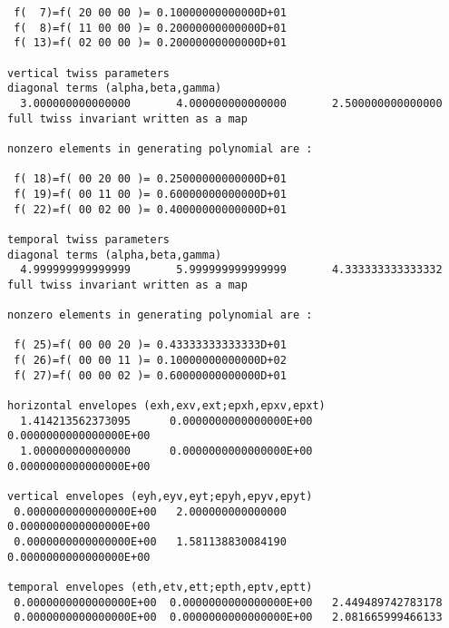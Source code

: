 \begin{footnotesize}
\begin{verbatim}
 f(  7)=f( 20 00 00 )= 0.10000000000000D+01
 f(  8)=f( 11 00 00 )= 0.20000000000000D+01
 f( 13)=f( 02 00 00 )= 0.20000000000000D+01

vertical twiss parameters
diagonal terms (alpha,beta,gamma)
  3.000000000000000       4.000000000000000       2.500000000000000
full twiss invariant written as a map

nonzero elements in generating polynomial are :

 f( 18)=f( 00 20 00 )= 0.25000000000000D+01
 f( 19)=f( 00 11 00 )= 0.60000000000000D+01
 f( 22)=f( 00 02 00 )= 0.40000000000000D+01

temporal twiss parameters
diagonal terms (alpha,beta,gamma)
  4.999999999999999       5.999999999999999       4.333333333333332
full twiss invariant written as a map

nonzero elements in generating polynomial are :

 f( 25)=f( 00 00 20 )= 0.43333333333333D+01
 f( 26)=f( 00 00 11 )= 0.10000000000000D+02
 f( 27)=f( 00 00 02 )= 0.60000000000000D+01

horizontal envelopes (exh,exv,ext;epxh,epxv,epxt)
  1.414213562373095      0.0000000000000000E+00  0.0000000000000000E+00
  1.000000000000000      0.0000000000000000E+00  0.0000000000000000E+00

vertical envelopes (eyh,eyv,eyt;epyh,epyv,epyt)
 0.0000000000000000E+00   2.000000000000000      0.0000000000000000E+00
 0.0000000000000000E+00   1.581138830084190      0.0000000000000000E+00

temporal envelopes (eth,etv,ett;epth,eptv,eptt)
 0.0000000000000000E+00  0.0000000000000000E+00   2.449489742783178
 0.0000000000000000E+00  0.0000000000000000E+00   2.081665999466133
\end{verbatim}
\end{footnotesize}
\newpage




